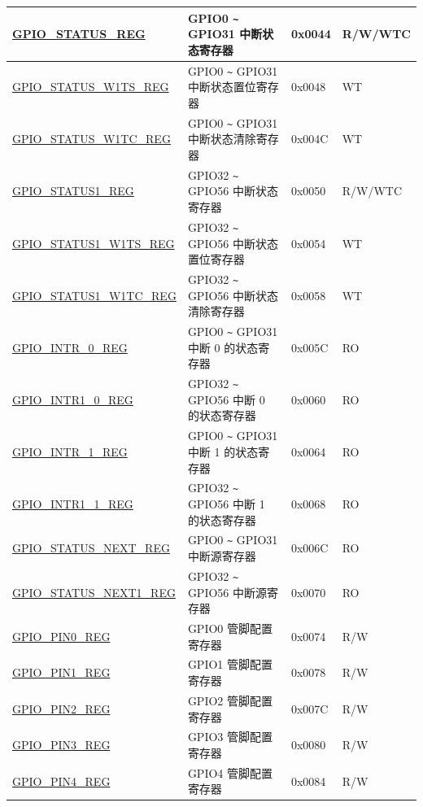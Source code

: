\begin{longtable}{ | p{5.8cm} | p{7.2cm} | p{1.3cm} | p{2.2cm} | }
\hyperref[regdesc:GPIOSTATUSREG]{GPIO\_STATUS\_REG} & GPIO0 \verb+~+ GPIO31 中断状态寄存器 & 0x0044 & R/W/WTC \\ \hline
\hyperref[regdesc:GPIOSTATUSW1TSREG]{GPIO\_STATUS\_W1TS\_REG} & GPIO0 \verb+~+ GPIO31 中断状态置位寄存器 & 0x0048 & WT \\ \hline
\hyperref[regdesc:GPIOSTATUSW1TCREG]{GPIO\_STATUS\_W1TC\_REG} & GPIO0 \verb+~+ GPIO31 中断状态清除寄存器 & 0x004C & WT \\ \hline
\hyperref[regdesc:GPIOSTATUS1REG]{GPIO\_STATUS1\_REG} & GPIO32 \verb+~+ GPIO56 中断状态寄存器 & 0x0050 & R/W/WTC \\ \hline
\hyperref[regdesc:GPIOSTATUS1W1TSREG]{GPIO\_STATUS1\_W1TS\_REG} & GPIO32 \verb+~+ GPIO56 中断状态置位寄存器 & 0x0054 & WT \\ \hline
\hyperref[regdesc:GPIOSTATUS1W1TCREG]{GPIO\_STATUS1\_W1TC\_REG} & GPIO32 \verb+~+ GPIO56 中断状态清除寄存器 & 0x0058 & WT \\ \hline
\hyperref[regdesc:GPIOINTR0REG]{GPIO\_INTR\_0\_REG} & GPIO0 \verb+~+ GPIO31 中断 0 的状态寄存器 & 0x005C & RO \\ \hline
\hyperref[regdesc:GPIOINTR10REG]{GPIO\_INTR1\_0\_REG} & GPIO32 \verb+~+ GPIO56 中断 0 的状态寄存器 & 0x0060 & RO \\ \hline
\hyperref[regdesc:GPIOINTR1REG]{GPIO\_INTR\_1\_REG} & GPIO0 \verb+~+ GPIO31 中断 1 的状态寄存器 & 0x0064 & RO \\ \hline
\hyperref[regdesc:GPIOINTR11REG]{GPIO\_INTR1\_1\_REG} & GPIO32 \verb+~+ GPIO56 中断 1 的状态寄存器 & 0x0068 & RO \\ \hline
\hyperref[regdesc:GPIOSTATUSNEXTREG]{GPIO\_STATUS\_NEXT\_REG} & GPIO0 \verb+~+ GPIO31 中断源寄存器 & 0x006C & RO \\ \hline
\hyperref[regdesc:GPIOSTATUSNEXT1REG]{GPIO\_STATUS\_NEXT1\_REG} & GPIO32 \verb+~+ GPIO56 中断源寄存器 & 0x0070 & RO \\ \hline
\hyperref[regdesc:GPIOPINNREG]{GPIO\_PIN0\_REG} & GPIO0 管脚配置寄存器 & 0x0074 & R/W \\ \hline
\hyperref[regdesc:GPIOPINNREG]{GPIO\_PIN1\_REG} & GPIO1 管脚配置寄存器 & 0x0078 & R/W \\ \hline
\hyperref[regdesc:GPIOPINNREG]{GPIO\_PIN2\_REG} & GPIO2 管脚配置寄存器 & 0x007C & R/W \\ \hline
\hyperref[regdesc:GPIOPINNREG]{GPIO\_PIN3\_REG} & GPIO3 管脚配置寄存器 & 0x0080 & R/W \\ \hline
\hyperref[regdesc:GPIOPINNREG]{GPIO\_PIN4\_REG} & GPIO4 管脚配置寄存器 & 0x0084 & R/W \\ \hline

\end{longtable}
